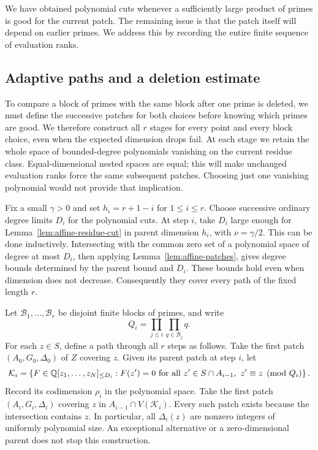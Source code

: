 We have obtained polynomial cuts whenever a sufficiently large product
of primes is good for the current patch.  The remaining issue is that
the patch itself will depend on earlier primes.  We address this by
recording the entire finite sequence of evaluation ranks.

\subsection{Adaptive paths and a deletion estimate}

To compare a block of primes with the same block after one prime is
deleted, we must define the successive patches for both choices before
knowing which primes are good. We therefore construct all $r$ stages
for every point and every block choice, even when the expected dimension
drops fail. At each stage we retain the whole space of bounded-degree
polynomials vanishing on the current residue class. Equal-dimensional
nested spaces are equal; this will make unchanged evaluation ranks
force the same subsequent patches. Choosing just one vanishing
polynomial would not provide that implication.

Fix a small $\gamma>0$ and set $h_i=r+1-i$ for $1\le i\le r$.
Choose successive ordinary degree limits $D_i$ for the polynomial
cuts.  At step $i$, take $D_i$ large enough for
Lemma~\ref{lem:affine-residue-cut} in parent dimension $h_i$, with
$\nu=\gamma/2$.  This can be done inductively.  Intersecting with the
common zero set of a polynomial space of degree at most $D_i$, then
applying Lemma~\ref{lem:affine-patches}, gives degree bounds determined
by the parent bound and $D_i$.  These bounds hold even when dimension
does not decrease.  Consequently they cover every path of the fixed
length $r$.

Let $\mathcal B_1,\ldots,\mathcal B_r$ be disjoint finite blocks of
primes, and write
\[
 Q_i=\prod_{j\le i}\prod_{q\in\mathcal B_j}q.
\]
For each $z\in S$, define a path through all $r$ steps as follows.
Take the first patch $(A_0,G_0,\Delta_0)$ of $Z$ covering $z$.
Given its parent patch at step $i$, let
\begin{equation}\label{eq:affine-evaluation-kernel}
 \mathcal K_i=
 \left\{F\in\mathbb Q[z_1,\ldots,z_N]_{\le D_i}:
 F(z')=0\text{ for all }z'\in S\cap A_{i-1},\ z'\equiv z\pmod{Q_i}
 \right\}.
\end{equation}
Record its codimension $\rho_i$ in the polynomial space.  Take the
first patch $(A_i,G_i,\Delta_i)$ covering $z$ in
$A_{i-1}\cap V(\mathcal K_i)$.  Every such patch exists because the
intersection contains $z$.  In particular, all $\Delta_i(z)$ are
nonzero integers of uniformly polynomial size. An exceptional
alternative or a zero-dimensional parent does not stop this
construction.


